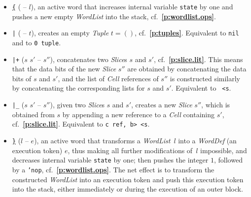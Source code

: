 \documentclass[12pt,oneside]{article}
\def\refpoint#1{{\rm\textbf{\ref{#1}}}}
\let\ptref=\refpoint
\begin{document}
\begin{itemize}
\item {\tt \underline{\{}} ( -- $l$), an active word that increases internal variable {\tt state} by one and pushes a new empty {\em WordList\/} into the stack, cf.~\ptref{p:wordlist.ops}.
\item {\tt |} ( -- $t$), creates an empty {\em Tuple\/} $t=()$, cf.~\ptref{p:tuples}. Equivalent to {\tt nil} and to {\tt 0 tuple}.
\item {\tt |+} ($s$ $s'$ -- $s''$), concatenates two {\em Slice}\/s $s$ and $s'$, cf.~\ptref{p:slice.lit}. This means that the data bits of the new {\em Slice\/} $s''$ are obtained by concatenating the data bits of $s$ and $s'$, and the list of {\em Cell\/} references of $s''$ is constructed similarly by concatenating the corresponding lists for $s$ and $s'$. Equivalent to {\tt <b rot s, swap s, b> <s}.
\item {\tt |\_} ($s$ $s'$ -- $s''$), given two {\em Slice\/}s $s$ and $s'$, creates a new {\em Slice\/} $s''$, which is obtained from $s$ by appending a new reference to a {\em Cell\/} containing $s'$, cf.~\ptref{p:slice.lit}. Equivalent to {\tt <b rot s, swap s>c ref, b> <s}.
\item {\tt \underline{\}}} ($l$ -- $e$), an active word that transforms a {\em WordList\/}~$l$ into a {\em WordDef\/} (an execution token) $e$, thus making all further modifications of~$l$ impossible, and decreases internal variable {\tt state} by one; then pushes the integer $1$, followed by a {\tt 'nop}, cf.~\ptref{p:wordlist.ops}. The net effect is to transform the constructed {\em WordList\/} into an execution token and push this execution token into the stack, either immediately or during the execution of an outer block.
\end{itemize}
\end{document}
